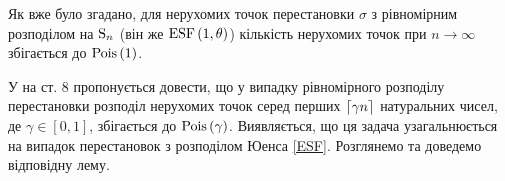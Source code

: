 


Як вже було згадано, для нерухомих точок перестановки $\sigma$ з рівномірним
розподілом на $\Sym{n}$ (він же $\ESF{1, \theta}$) кількість нерухомих точок 
при $n\to\infty$ збігається до $\Poiss{1}$. 

У \cite{last_penrose_2017} на ст. 8 пропонується довести, що у випадку рівномірного розподілу перестановки
розподіл нерухомих точок серед перших $\ceil*{\gamma n}$ натуральних чисел, де
$\gamma \in [0, 1]$, збігається до $\Poiss{\gamma}$.
Виявляється, що ця задача узагальнюється на випадок перестановок
з розподілом Юенса \eqref{ESF}. Розглянемо та доведемо відповідну лему.


